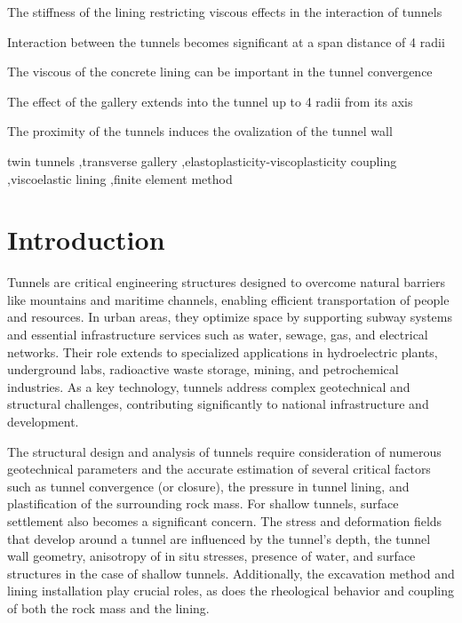 \documentclass[a4paper,fleqn]{cas-sc}
\begin{document}
\begin{highlights}
	\item The stiffness of the lining restricting viscous effects in the interaction of tunnels
	\item Interaction between the tunnels becomes significant at a span distance of 4 radii
	\item The viscous of the concrete lining can be important in the tunnel convergence
	\item The effect of the gallery extends into the tunnel up to 4 radii from its axis
	\item The proximity of the tunnels induces the ovalization of the tunnel wall 
\end{highlights}

\begin{keywords}
twin tunnels \sep transverse gallery \sep elastoplasticity-viscoplasticity coupling
\sep viscoelastic lining \sep finite element method
\end{keywords}

\maketitle

\section{Introduction}\label{}

Tunnels are critical engineering structures designed to overcome natural barriers like mountains and maritime channels, enabling efficient transportation of people and resources. In urban areas, they optimize space by supporting subway systems and essential infrastructure services such as water, sewage, gas, and electrical networks. Their role extends to specialized applications in hydroelectric plants, underground labs, radioactive waste storage, mining, and petrochemical industries. As a key technology, tunnels address complex geotechnical and structural challenges, contributing significantly to national infrastructure and development.

The structural design and analysis of tunnels require consideration of numerous geotechnical parameters and the accurate estimation of several critical factors such as tunnel convergence (or closure), the pressure in tunnel lining, and plastification of the surrounding rock mass. For shallow tunnels, surface settlement also becomes a significant concern. The stress and deformation fields that develop around a tunnel are influenced by the tunnel's depth, the tunnel wall geometry, anisotropy of in situ stresses, presence of water, and surface structures in the case of shallow tunnels. Additionally, the excavation method and lining installation play crucial roles, as does the rheological behavior and coupling of both the rock mass and the lining.
\end{document}
